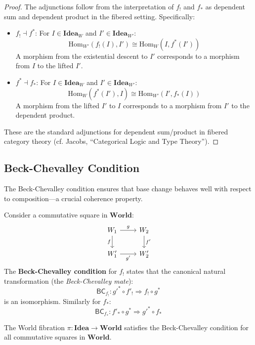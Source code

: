 \begin{proof}
The adjunctions follow from the interpretation of $f_!$ and $f_*$ as dependent
sum and dependent product in the fibered setting. Specifically:
\begin{itemize}
  \item $f_! \dashv f^*$: For $I \in \mathbf{Idea}_W$ and $I' \in \mathbf{Idea}_{W'}$:
        \[
          \mathrm{Hom}_{W'}(f_!(I), I') \cong \mathrm{Hom}_W(I, f^*(I'))
        \]
        A morphism from the existential descent to $I'$ corresponds to a
        morphism from $I$ to the lifted $I'$.
  \item $f^* \dashv f_*$: For $I \in \mathbf{Idea}_W$ and $I' \in \mathbf{Idea}_{W'}$:
        \[
          \mathrm{Hom}_W(f^*(I'), I) \cong \mathrm{Hom}_{W'}(I', f_*(I))
        \]
        A morphism from the lifted $I'$ to $I$ corresponds to a morphism
        from $I'$ to the dependent product.
\end{itemize}
These are the standard adjunctions for dependent sum/product in fibered
category theory (cf. Jacobs, ``Categorical Logic and Type Theory'').
\end{proof}

\subsection{Beck-Chevalley Condition}
\label{subsec:beck-chevalley}

The Beck-Chevalley condition ensures that base change behaves well with
respect to composition---a crucial coherence property.

\begin{definition}
\label{def:beck-chevalley}
Consider a commutative square in $\mathbf{World}$:
\[
\begin{tikzcd}
  W_1 \arrow[r, "g"] \arrow[d, "f"'] & W_2 \arrow[d, "f'"] \\
  W_1' \arrow[r, "g'"'] & W_2'
\end{tikzcd}
\]
The \textbf{Beck-Chevalley condition} for $f_!$ states that the canonical
natural transformation (the \emph{Beck-Chevalley mate}):
\[
  \mathsf{BC}_{f_!} : g'^* \circ f'_! \Longrightarrow f_! \circ g^*
\]
is an isomorphism. Similarly for $f_*$:
\[
  \mathsf{BC}_{f_*} : f'_* \circ g^* \Longrightarrow g'^* \circ f_*
\]
\end{definition}

\begin{theorem}
\label{thm:beck-chevalley-world}
The World fibration $\pi : \mathbf{Idea} \to \mathbf{World}$ satisfies the
Beck-Chevalley condition for all commutative squares in $\mathbf{World}$.
\end{theorem}

